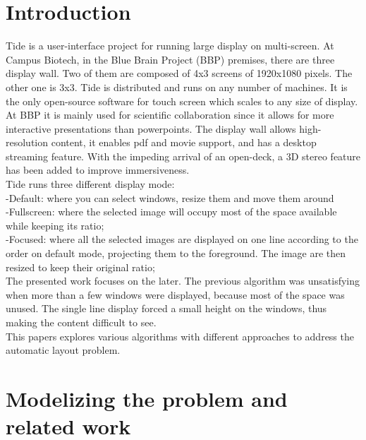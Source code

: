\documentclass{acmtog}
\begin{document}
\section{Introduction}
Tide is a user-interface project for running large display on multi-screen. At Campus Biotech, in the Blue Brain Project (BBP) premises, there are three display wall. Two of them are composed of 4x3 screens of 1920x1080 pixels. The other one is 3x3. Tide is distributed and runs on any number of machines. It is the only open-source software for touch screen which scales to any size of display. At BBP it is mainly used for scientific collaboration since it allows for more interactive presentations  than powerpoints. The display wall allows  high-resolution content, it enables pdf and movie support, and has a desktop streaming feature. With the impeding arrival of an open-deck, 
a 3D stereo feature has been added to improve immersiveness. \\
Tide runs three different display mode:\\
-Default: where you can select windows, resize them and move them around \\
-Fullscreen: where the selected image will occupy most of the space available while keeping its ratio; \\
-Focused: where  all the selected images are displayed on one line according to the order on default mode, projecting them to the foreground. The image are then resized to keep their original ratio;\\
The presented work focuses on the later. 
The previous algorithm was unsatisfying when more than a few windows were displayed, because most of the space was unused. The single line display forced a small height on the windows, thus making the content difficult to see.  \\
This papers explores various algorithms with different approaches to address the automatic layout problem.\\


\section{Modelizing the problem and related work}
\end{document}
